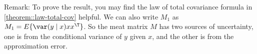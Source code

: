 Remark: To prove the result, you may find the law of total covariance formula in \eqref{theorem::law-total-cov} helpful. We can also write $M_1$ as $M_1 = E\{ \var(y\mid x) xx^{\T} \}$. So the meat matrix $M$ has two sources of uncertainty, one is from the conditional variance of $y$ given $x$, and the other is from the approximation error. 
 
 
